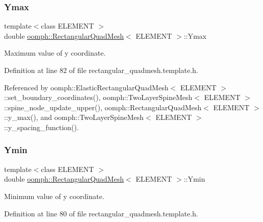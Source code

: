 \subsubsection{\texorpdfstring{Ymax}{Ymax}}
{\footnotesize\ttfamily template$<$class E\+L\+E\+M\+E\+NT $>$ \\
double \hyperlink{classoomph_1_1RectangularQuadMesh}{oomph\+::\+Rectangular\+Quad\+Mesh}$<$ E\+L\+E\+M\+E\+NT $>$\+::Ymax\hspace{0.3cm}{\ttfamily [protected]}}



Maximum value of y coordinate. 



Definition at line 82 of file rectangular\+\_\+quadmesh.\+template.\+h.



Referenced by oomph\+::\+Elastic\+Rectangular\+Quad\+Mesh$<$ E\+L\+E\+M\+E\+N\+T $>$\+::set\+\_\+boundary\+\_\+coordinates(), oomph\+::\+Two\+Layer\+Spine\+Mesh$<$ E\+L\+E\+M\+E\+N\+T $>$\+::spine\+\_\+node\+\_\+update\+\_\+upper(), oomph\+::\+Rectangular\+Quad\+Mesh$<$ E\+L\+E\+M\+E\+N\+T $>$\+::y\+\_\+max(), and oomph\+::\+Two\+Layer\+Spine\+Mesh$<$ E\+L\+E\+M\+E\+N\+T $>$\+::y\+\_\+spacing\+\_\+function().

\mbox{\label{classoomph_1_1RectangularQuadMesh_ade53fec7446044418ccba9f55d692adb}} 
\subsubsection{\texorpdfstring{Ymin}{Ymin}}
{\footnotesize\ttfamily template$<$class E\+L\+E\+M\+E\+NT $>$ \\
double \hyperlink{classoomph_1_1RectangularQuadMesh}{oomph\+::\+Rectangular\+Quad\+Mesh}$<$ E\+L\+E\+M\+E\+NT $>$\+::Ymin\hspace{0.3cm}{\ttfamily [protected]}}



Minimum value of y coordinate. 



Definition at line 80 of file rectangular\+\_\+quadmesh.\+template.\+h.




